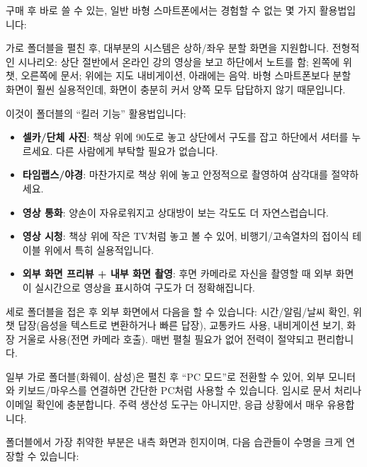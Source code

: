 
구매 후 바로 쓸 수 있는, 일반 바형 스마트폰에서는 경험할 수 없는 몇 가지 활용법입니다:


가로 폴더블을 펼친 후, 대부분의 시스템은 상하/좌우 분할 화면을 지원합니다. 전형적인 시나리오: 상단 절반에서 온라인 강의 영상을 보고 하단에서 노트를 함; 왼쪽에 위챗, 오른쪽에 문서; 위에는 지도 내비게이션, 아래에는 음악. 바형 스마트폰보다 분할 화면이 훨씬 실용적인데, 화면이 충분히 커서 양쪽 모두 답답하지 않기 때문입니다.


이것이 폴더블의 “킬러 기능” 활용법입니다:

\begin{itemize}
  \item \textbf{셀카/단체 사진}: 책상 위에 90도로 놓고 상단에서 구도를 잡고 하단에서 셔터를 누르세요. 다른 사람에게 부탁할 필요가 없습니다.
  \item \textbf{타임랩스/야경}: 마찬가지로 책상 위에 놓고 안정적으로 촬영하여 삼각대를 절약하세요.
  \item \textbf{영상 통화}: 양손이 자유로워지고 상대방이 보는 각도도 더 자연스럽습니다.
  \item \textbf{영상 시청}: 책상 위에 작은 TV처럼 놓고 볼 수 있어, 비행기/고속열차의 접이식 테이블 위에서 특히 실용적입니다.
  \item \textbf{외부 화면 프리뷰 + 내부 화면 촬영}: 후면 카메라로 자신을 촬영할 때 외부 화면이 실시간으로 영상을 표시하여 구도가 더 정확해집니다.
\end{itemize}


세로 폴더블을 접은 후 외부 화면에서 다음을 할 수 있습니다: 시간/알림/날씨 확인, 위챗 답장(음성을 텍스트로 변환하거나 빠른 답장), 교통카드 사용, 내비게이션 보기, 화장 거울로 사용(전면 카메라 호출). 매번 펼칠 필요가 없어 전력이 절약되고 편리합니다.


일부 가로 폴더블(화웨이, 삼성)은 펼친 후 “PC 모드”로 전환할 수 있어, 외부 모니터와 키보드/마우스를 연결하면 간단한 PC처럼 사용할 수 있습니다. 임시로 문서 처리나 이메일 확인에 충분합니다. 주력 생산성 도구는 아니지만, 응급 상황에서 매우 유용합니다.


폴더블에서 가장 취약한 부분은 내측 화면과 힌지이며, 다음 습관들이 수명을 크게 연장할 수 있습니다:

